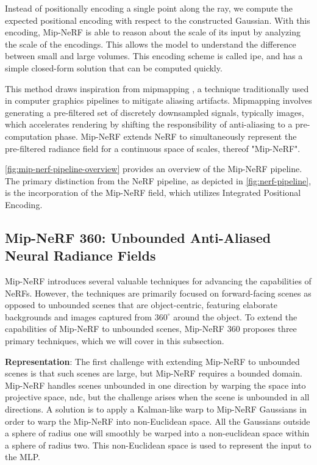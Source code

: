 

Instead of positionally encoding a single point along the ray, we compute the expected positional encoding with respect to the 
constructed Gaussian. With this encoding, Mip-NeRF is able to reason about the scale of its input by analyzing the scale of the encodings. This allows the model to understand the difference between small and large volumes. This encoding scheme is called \acrfull{ipe}, and has a simple closed-form solution that can be computed quickly.

This method draws inspiration from mipmapping \cite{williams1983pyramidal}, a technique traditionally used in computer graphics pipelines to mitigate aliasing artifacts. Mipmapping involves generating a pre-filtered set of discretely downsampled signals, typically images, which accelerates rendering by shifting the responsibility of anti-aliasing to a pre-computation phase. Mip-NeRF extends NeRF to simultaneously represent the pre-filtered radiance field for a continuous space of scales, thereof "Mip-NeRF".

\autoref{fig:mip-nerf-pipeline-overview} provides an overview of the Mip-NeRF pipeline. The primary distinction from the NeRF pipeline, as depicted in \autoref{fig:nerf-pipeline}, is the incorporation of the Mip-NeRF field, which utilizes Integrated Positional Encoding.





\subsection[Mip-NeRF 360]{Mip-NeRF 360: Unbounded Anti-Aliased Neural Radiance Fields} \label{sec:mipnerf360}
Mip-NeRF introduces several valuable techniques for advancing the capabilities of NeRFs. However, the techniques are primarily focused on forward-facing scenes \cite{mildenhall2019llff} as opposed to unbounded scenes that are object-centric, featuring elaborate backgrounds and images captured from $360^\circ$ around the object. To extend the capabilities of Mip-NeRF to unbounded scenes, Mip-NeRF 360 \cite{barron_mip-nerf_2022} proposes three primary techniques, which we will cover in this subsection.

\textbf{Representation}:
The first challenge with extending Mip-NeRF to unbounded scenes is that such scenes are large, but Mip-NeRF requires a bounded domain. Mip-NeRF handles scenes unbounded in one direction by warping the space into projective space, \acrfull{ndc}, but the challenge arises when the scene is unbounded in all directions. A solution is to apply a Kalman-like warp to Mip-NeRF Gaussians in order to warp the Mip-NeRF into non-Euclidean space. All the Gaussians outside a sphere of radius one will smoothly be warped into a non-euclidean space within a sphere of radius two. This non-Euclidean space is used to represent the input to the MLP. 



